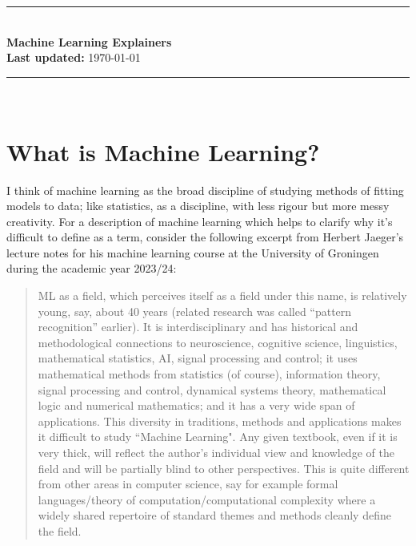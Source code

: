 \documentclass[11pt]{article}
\begin{document}
\begin{center}
\hspace*{\fill}\rule{0.95\linewidth}{0.1pt}\hspace*{\fill}\\[0.6cm]
{\huge\bfseries Machine Learning Explainers}\\[0.1cm]
\textbf{Last updated:} \today\\
\hspace*{\fill}\rule{0.95\linewidth}{0.1pt}\hspace*{\fill}\\
\end{center}

\begin{abstract}
    \noindent Summaries of machine/deep learning-related topics. My main motive in writing these summaries is as a reminder for my future self.
\end{abstract}

\setcounter{tocdepth}{2}{\footnotesize\tableofcontents}


\thispagestyle{empty}
\setcounter{page}{0}
\newpage

\section{What is Machine Learning?}
I think of machine learning as the broad discipline of studying methods of fitting models to data; like statistics, as a discipline, with less rigour but more messy creativity. For a description of machine learning which helps to clarify why it's difficult to define as a term, consider the following excerpt from Herbert Jaeger's lecture notes for his machine learning course at the University of Groningen during the academic year 2023/24:
\begin{quotation}
    ML as a ﬁeld, which perceives itself as a ﬁeld under this name, is relatively young, say, about 40 years (related research was called “pattern recognition” earlier). It is interdisciplinary and has historical and methodological connections to neuroscience, cognitive science, linguistics, mathematical statistics, AI, signal processing and control; it uses mathematical methods from statistics (of course), information theory, signal processing and control, dynamical systems theory, mathematical logic and numerical mathematics; and it has a very wide span of applications. This diversity in traditions, methods and applications makes it diﬃcult to study ``Machine Learning". Any given textbook, even if it is very thick, will reﬂect the author's individual view and knowledge of the ﬁeld and will be partially blind to other perspectives. This is quite diﬀerent from other areas in computer science, say for example formal languages/theory of computation/computational complexity where a widely shared repertoire of standard themes and methods cleanly deﬁne the ﬁeld.
\end{quotation}
\end{document}
